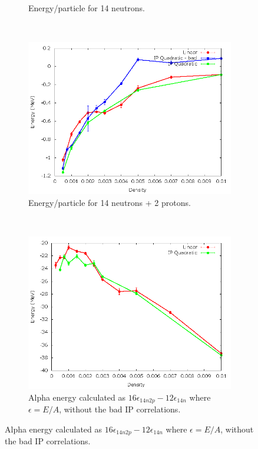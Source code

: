 \documentclass[12pt]{article}
\begin{document}
\begin{figure}[h!]
\begin{subfigure}{0.49\textwidth}
      \caption{Energy/particle for 14 neutrons.}
   \end{subfigure}
   ~
   \begin{subfigure}{0.49\textwidth}
      \includegraphics[width=\textwidth]{../14n2p.png}
      \caption{Energy/particle for 14 neutrons + 2 protons.}
   \end{subfigure}
   ~
   \begin{subfigure}{0.49\textwidth}
      \includegraphics[width=\textwidth]{../alpha.png}
      \caption{Alpha energy calculated as $16\epsilon_{14n2p}-12\epsilon_{14n}$ where $\epsilon=E/A$, without the bad IP correlations.}
   \end{subfigure}
\end{figure}
\newpage
\end{document}
